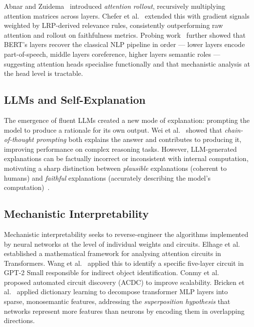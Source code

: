 \documentclass[12pt]{article}
\begin{document}
Abnar and Zuidema~\cite{abnar2020quantifying} introduced \emph{attention rollout},
recursively multiplying attention matrices across layers. Chefer et
al.~\cite{chefer2021transformer} extended this with gradient signals weighted by
LRP-derived relevance rules, consistently outperforming raw attention and rollout
on faithfulness metrics. Probing work~\cite{tenney2019bert,rogers2020bertology}
further showed that BERT's layers recover the classical NLP pipeline in order ---
lower layers encode part-of-speech, middle layers coreference, higher layers
semantic roles --- suggesting attention heads specialise functionally and that
mechanistic analysis at the head level is tractable.

\subsection{LLMs and Self-Explanation}

The emergence of fluent LLMs created a new mode of explanation: prompting the
model to produce a rationale for its own output. Wei et
al.~\cite{wei2022chainofthought} showed that \emph{chain-of-thought prompting}
both explains the answer and contributes to producing it, improving performance on
complex reasoning tasks. However, LLM-generated explanations can be factually
incorrect or inconsistent with internal computation, motivating a sharp distinction
between \emph{plausible} explanations (coherent to humans) and \emph{faithful}
explanations (accurately describing the model's computation)~\cite{jacovi2020faithfully}.

\subsection{Mechanistic Interpretability}

Mechanistic interpretability seeks to reverse-engineer the algorithms implemented
by neural networks at the level of individual weights and circuits. Elhage et
al.~\cite{elhage2021mathematical} established a mathematical framework for
analysing attention circuits in Transformers. Wang et
al.~\cite{wang2022interpretability} applied this to identify a specific five-layer
circuit in GPT-2 Small responsible for indirect object identification. Conmy et
al.~\cite{conmy2023automating} proposed automated circuit discovery (ACDC) to
improve scalability. Bricken et al.~\cite{bricken2023monosemanticity} applied
dictionary learning to decompose transformer MLP layers into sparse, monosemantic
features, addressing the \emph{superposition hypothesis} that networks represent
more features than neurons by encoding them in overlapping directions.
\end{document}
